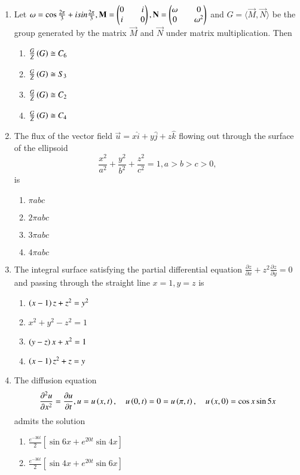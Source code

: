 \documentclass[journal,12pt,onecolumn]{IEEEtran}
\theoremstyle{remark}
\begin{document}
\begin{enumerate}
\begin{enumerate}
    \end{enumerate}
    \item Let $\omega=\cos\frac{2\pi}{3}+isin\frac{2\pi}{3},\mathbf{M}=\begin{pmatrix}0 && i\\i && 0\end{pmatrix},\mathbf{N}=\begin{pmatrix}\omega && 0\\ 0 &&\omega^{2}\end{pmatrix}$ and $G=\langle \vec{M} ,\vec{N} \rangle $ be the group generated by the matrix $\vec{M}$ and $\vec{N}$ under matrix multiplication. Then
    \begin{enumerate}
        \item $\frac{G}{Z}\left(G\right)\cong C_6$
         \item $\frac{G}{Z}\left(G\right)\cong S_3$
          \item $\frac{G}{Z}\left(G\right)\cong C_2$
          \item $\frac{G}{Z}\left(G\right)\cong C_4$ 
    \end{enumerate}
    \item The flux of the vector field $\vec{u}=x\hat{i}+y\hat{j}+z\hat{k}$ flowing out through the surface of the ellipsoid $$\frac{x^2}{a^2}+\frac{y^2}{b^2}+\frac{z^2}{c^2}=1,a>b>c>0,$$ is
    \begin{enumerate}
        \item $\pi abc$
        \item $2\pi abc$
        \item $3\pi abc$
        \item $4\pi abc$
    \end{enumerate}
    \item The integral surface satisfying the partial differential equation  $\frac{\partial z}{\partial x}+z^2\frac{\partial z}{\partial y}=0$ and passing through the straight line $x=1,y=z$ is
    \begin{enumerate}
        \item $\left(x-1\right)z+z^2=y^2$
        \item $x^2+y^2-z^2=1$
        \item $\left(y-z\right)x+x^2=1$
        \item $\left(x-1\right)z^2+z=y$
    \end{enumerate}
\item The diffusion equation $$\frac{\partial^2 u}{\partial x^2}=\frac{\partial u}{\partial t}, u=u\left(x,t\right),\quad u\left(0,t\right)=0=u\left(\pi,t\right), \quad u\left(x,0\right)=\cos x\sin 5x$$ admits the solution
\begin{enumerate}
    \item $\frac{e^{-36t}}{2}[\sin 6x+e^{20t}\sin 4x]$
    \item $\frac{e^{-36t}}{2}[\sin 4x+e^{20t}\sin 6x]$

\end{enumerate}
\end{enumerate}
\end{document}
